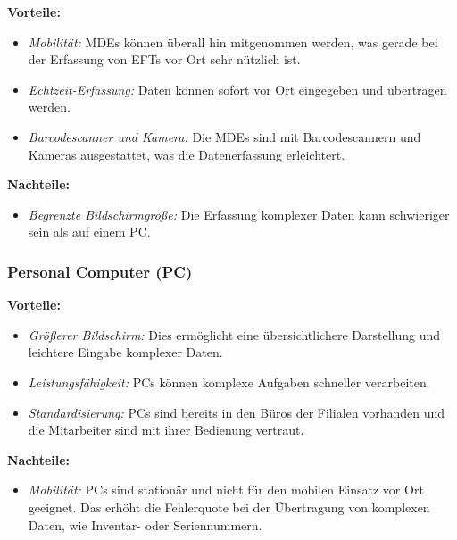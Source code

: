 \documentclass[12pt, a4paper]{article}
\begin{document}
\textbf{Vorteile:}
\begin{itemize}
\item \textit{Mobilität:} MDEs können überall hin mitgenommen werden, was gerade bei der Erfassung von EFTs vor Ort sehr nützlich ist.
\item \textit{Echtzeit-Erfassung:} Daten können sofort vor Ort eingegeben und übertragen werden.
\item \textit{Barcodescanner und Kamera:} Die MDEs sind mit Barcodescannern und Kameras ausgestattet, was die Datenerfassung erleichtert.
\end{itemize}

\textbf{Nachteile:}
\begin{itemize}
\item \textit{Begrenzte Bildschirmgröße:} Die Erfassung komplexer Daten kann schwieriger sein als auf einem PC.
\end{itemize}

\subsubsection{Personal Computer (PC)}

\textbf{Vorteile:}
\begin{itemize}
\item \textit{Größerer Bildschirm:} Dies ermöglicht eine übersichtlichere Darstellung und leichtere Eingabe komplexer Daten.
\item \textit{Leistungsfähigkeit:} PCs können komplexe Aufgaben schneller verarbeiten.
\item \textit{Standardisierung:} PCs sind bereits in den Büros der Filialen vorhanden und die Mitarbeiter sind mit ihrer Bedienung vertraut.
\end{itemize}

\textbf{Nachteile:}
\begin{itemize}
\item \textit{Mobilität:} PCs sind stationär und nicht für den mobilen Einsatz vor Ort geeignet. Das erhöht die Fehlerquote bei der Übertragung von komplexen Daten,
wie Inventar- oder Seriennummern.
\end{itemize}
\end{document}
